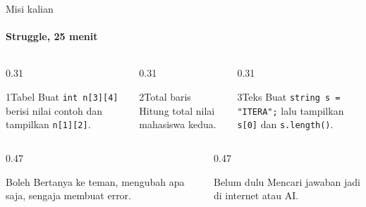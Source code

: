 \documentclass[t]{beamer}
\begin{document}

\begin{frame}{Misi kalian}
\framesubtitle{Struggle, 25 menit}
\begin{columns}[T]
\begin{column}{0.31\textwidth}
\begin{Langkah}{1}{Tabel}
Buat \texttt{int n[3][4]} berisi nilai contoh dan tampilkan \texttt{n[1][2]}.
\end{Langkah}
\end{column}
\begin{column}{0.31\textwidth}
\begin{Langkah}{2}{Total baris}
Hitung total nilai mahasiswa kedua.
\end{Langkah}
\end{column}
\begin{column}{0.31\textwidth}
\begin{Langkah}{3}{Teks}
Buat \texttt{string s = "ITERA";} lalu tampilkan \texttt{s[0]} dan \texttt{s.length()}.
\end{Langkah}
\end{column}
\end{columns}
\vspace{8pt}
\begin{columns}[T]
\begin{column}{0.47\textwidth}
\begin{Blok}{Boleh}
Bertanya ke teman, mengubah apa saja, sengaja membuat error.
\end{Blok}
\end{column}
\begin{column}{0.47\textwidth}
\begin{BlokAlert}{Belum dulu}
Mencari jawaban jadi di internet atau AI.
\end{BlokAlert}
\end{column}
\end{columns}
\end{frame}
\end{document}
